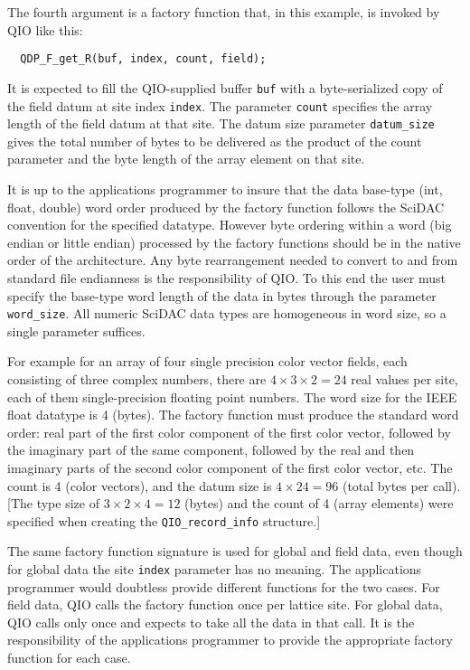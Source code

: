 \documentclass{article}
\begin{document}
The fourth argument is a factory function that, in this example, is
invoked by QIO like this:
%
\begin{verbatim}
  QDP_F_get_R(buf, index, count, field);
\end{verbatim}
%
It is expected to fill the QIO-supplied buffer \verb|buf| with a
byte-serialized copy of the field datum at site index \verb|index|.
The parameter \verb|count| specifies the array length of the field
datum at that site.  The datum size parameter \verb|datum_size| gives
the total number of bytes to be delivered as the product of the count
parameter and the byte length of the array element on that site.

It is up to the applications programmer to insure that the data
base-type (int, float, double) word order produced by the factory
function follows the SciDAC convention for the specified datatype.
However byte ordering within a word (big endian or little endian)
processed by the factory functions should be in the native order of
the architecture.  Any byte rearrangement needed to convert to and
from standard file endianness is the responsibility of QIO.  To this
end the user must specify the base-type word length of the data in
bytes through the parameter \verb|word_size|.  All numeric SciDAC data
types are homogeneous in word size, so a single parameter
suffices.

For example for an array of four single precision color vector fields,
each consisting of three complex numbers, there are $4 \times 3 \times
2 = 24$ real values per site, each of them single-precision floating
point numbers.  The word size for the IEEE float datatype is 4
(bytes).  The factory function must produce the standard word order:
real part of the first color component of the first color vector,
followed by the imaginary part of the same component, followed by the
real and then imaginary parts of the second color component of the
first color vector, etc. The count is 4 (color vectors), and the datum
size is $4 \times 24 = 96$ (total bytes per call).  [The type size of
$3 \times 2 \times 4 = 12$ (bytes) and the count of 4 (array elements)
were specified when creating the \verb|QIO_record_info| structure.]

The same factory function signature is used for global and field data,
even though for global data the site \verb|index| parameter has no
meaning.  The applications programmer would doubtless provide
different functions for the two cases.  For field data, QIO calls the
factory function once per lattice site.  For global data, QIO calls
only once and expects to take all the data in that call.  It is the
responsibility of the applications programmer to provide the
appropriate factory function for each case.
\end{document}
